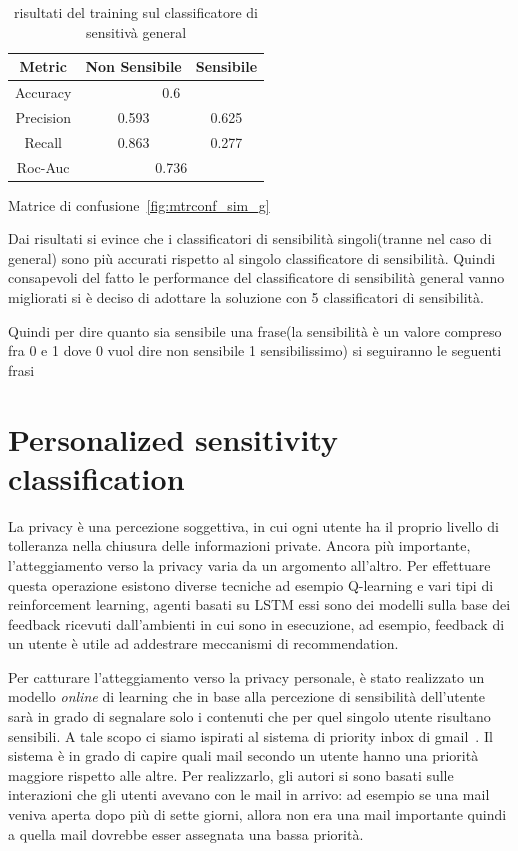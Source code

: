 \begin{table}[h]
\label{tbl:training_sens_general}
\centering
\begin{tabular}{|c|c|c|}
\hline
\textbf{Metric} & \textbf{Non Sensibile} & \textbf{Sensibile} \\ \hline
Accuracy & \multicolumn{2}{c|}{0.6} \\ \hline
Precision & 0.593 & 0.625 \\ \hline
Recall & 0.863 & 0.277 \\ \hline
Roc-Auc & \multicolumn{2}{c|}{0.736} \\ \hline
\end{tabular}
\caption{risultati del training sul classificatore di sensitivà general}
\end{table}
\FloatBarrier

Matrice di confusione~\ref{fig:mtrconf_sim_g}

Dai risultati si evince che i classificatori di sensibilità singoli(tranne nel caso di general) sono più accurati rispetto al singolo classificatore di sensibilità. Quindi consapevoli del fatto le performance del classificatore di sensibilità general vanno migliorati si è deciso di adottare la soluzione con 5 classificatori di sensibilità.

Quindi per dire quanto sia sensibile una frase(la sensibilità è un valore compreso fra 0 e 1 dove 0 vuol dire non sensibile 1 sensibilissimo) si seguiranno le seguenti frasi

\section{Personalized sensitivity classification}
\label{sec:pres_sens_class}
La privacy è una percezione soggettiva, in cui ogni utente ha il proprio livello di tolleranza nella chiusura delle informazioni private. Ancora più importante, l'atteggiamento verso la privacy varia da un argomento all'altro. Per effettuare questa operazione esistono diverse tecniche ad esempio Q-learning\cite{q-learning} e vari tipi di reinforcement learning\cite{reinfoce-learn}, agenti basati su LSTM\cite{lstm} essi sono dei modelli sulla base dei feedback ricevuti dall'ambienti in cui sono in esecuzione, ad esempio, feedback di un utente è utile ad addestrare meccanismi di recommendation.

Per catturare l'atteggiamento verso la privacy personale, è stato realizzato un modello \textit{online} di learning che in base alla percezione di sensibilità dell'utente sarà in grado di segnalare solo i contenuti che per quel singolo utente risultano sensibili.
A tale scopo ci siamo ispirati al sistema di priority inbox di gmail~\cite{inbox}.
Il sistema è in grado di capire quali mail secondo un utente hanno una priorità maggiore rispetto alle altre. Per realizzarlo, gli autori si sono basati sulle interazioni che gli utenti avevano con le mail in arrivo: ad esempio se una mail veniva aperta dopo più di sette giorni, allora non era una mail importante quindi a quella mail dovrebbe esser assegnata una bassa priorità.

